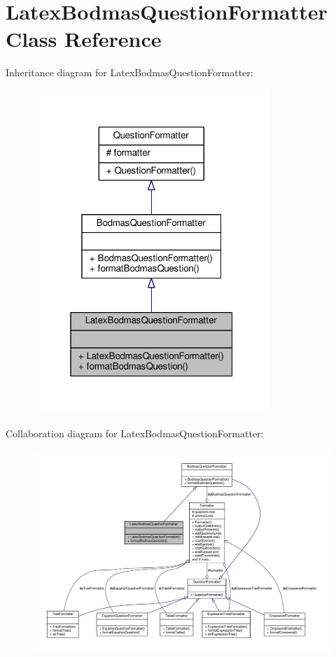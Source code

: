 \hypertarget{classLatexBodmasQuestionFormatter}{}\section{Latex\+Bodmas\+Question\+Formatter Class Reference}
\label{classLatexBodmasQuestionFormatter}


Inheritance diagram for Latex\+Bodmas\+Question\+Formatter\+:
\nopagebreak
\begin{figure}[H]
\begin{center}
\leavevmode
\includegraphics[width=253pt]{classLatexBodmasQuestionFormatter__inherit__graph}
\end{center}
\end{figure}


Collaboration diagram for Latex\+Bodmas\+Question\+Formatter\+:
\nopagebreak
\begin{figure}[H]
\begin{center}
\leavevmode
\includegraphics[width=350pt]{classLatexBodmasQuestionFormatter__coll__graph}
\end{center}
\end{figure}
